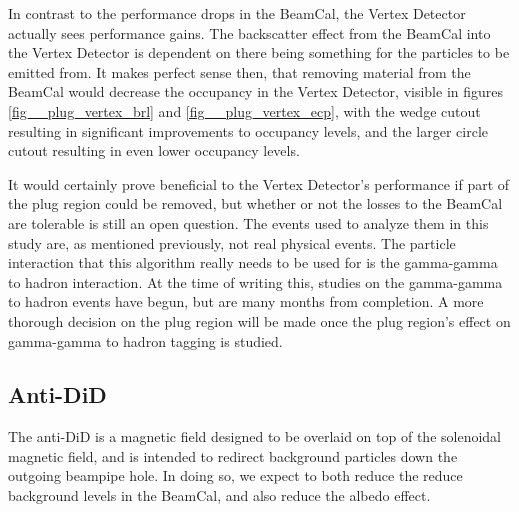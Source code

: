 \documentclass{report}
\begin{document}
                In contrast to the performance drops in the BeamCal, the Vertex Detector actually sees performance gains. The backscatter effect from the BeamCal into the Vertex Detector is dependent on there being something for the particles to be emitted from. It makes perfect sense then, that removing material from the BeamCal would decrease the occupancy in the Vertex Detector, visible in figures \ref{fig__plug_vertex_brl} and \ref{fig__plug_vertex_ecp}, with the wedge cutout resulting in significant improvements to occupancy levels, and the larger circle cutout resulting in even lower occupancy levels.
                

                It would certainly prove beneficial to the Vertex Detector's performance if part of the plug region could be removed, but whether or not the losses to the BeamCal are tolerable is still an open question. The events used to analyze them in this study are, as mentioned previously, not real physical events. The particle interaction that this algorithm really needs to be used for is the gamma-gamma to hadron interaction. At the time of writing this, studies on the gamma-gamma to hadron events have begun, but are many months from completion. A more thorough decision on the plug region will be made once the plug region's effect on gamma-gamma to hadron tagging is studied.

            
            \subsection{Anti-DiD}
                The anti-DiD is a magnetic field designed to be overlaid on top of the solenoidal magnetic field, and is intended to redirect background particles down the outgoing beampipe hole. In doing so, we expect to both reduce the reduce background levels in the BeamCal, and also reduce the albedo effect.
\end{document}
